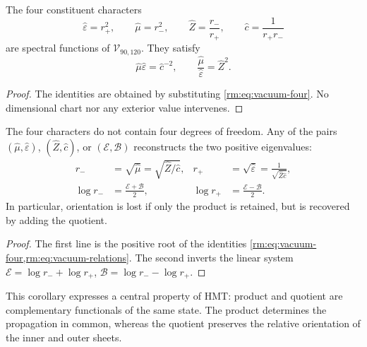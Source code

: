 \begin{theorem}
The four constituent characters
\begin{equation}
\widehat\varepsilon=r_+^2,\qquad
\widehat\mu=r_-^2,\qquad
\widehat Z=\frac{r_-}{r_+},\qquad
\widehat c=\frac1{r_+r_-}
\label{rm:eq:vacuum-four}
\end{equation}
are spectral functions of \(\mathcal V_{90,120}\). They satisfy
\begin{equation}
\widehat\mu\widehat\varepsilon=\widehat c^{-2},
\qquad
\frac{\widehat\mu}{\widehat\varepsilon}=\widehat Z^2.
\label{rm:eq:vacuum-relations}
\end{equation}
\end{theorem}

\begin{proof}
The identities are obtained by substituting \cref{rm:eq:vacuum-four}. No dimensional chart nor any exterior value intervenes.
\end{proof}

\begin{corollary}
The four characters do not contain four degrees of freedom. Any of
the pairs \((\widehat\mu,\widehat\varepsilon)\),
\((\widehat Z,\widehat c)\), or \((\mathcal E,\mathcal B)\) reconstructs the
two positive eigenvalues:
\begin{align}
r_-&=\sqrt{\widehat\mu}
=\sqrt{\widehat Z/\widehat c},
&r_+&=\sqrt{\widehat\varepsilon}
=\frac1{\sqrt{\widehat Z\widehat c}},
\label{rm:eq:vacuum-reconstruct-r}\\
\log r_-&=\frac{\mathcal E+\mathcal B}{2},
&\log r_+&=\frac{\mathcal E-\mathcal B}{2}.
\label{rm:eq:vacuum-reconstruct-log}
\end{align}
In particular, orientation is lost if only the product is retained,
but is recovered by adding the quotient.
\end{corollary}

\begin{proof}
The first line is the positive root of the identities
\cref{rm:eq:vacuum-four,rm:eq:vacuum-relations}. The second inverts the linear
system
\(\mathcal E=\log r_-+\log r_+\),
\(\mathcal B=\log r_--\log r_+\).
\end{proof}

This corollary expresses a central property of HMT: product and quotient are
complementary functionals of the same state. The product determines the
propagation in common, whereas the quotient preserves the relative orientation
of the inner and outer sheets.

